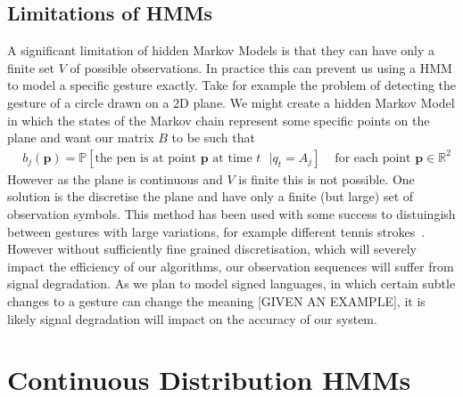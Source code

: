 \subsection{Limitations of HMMs}
A significant limitation of hidden Markov Models is that they can have only a finite set $V$ of possible observations. In practice this can prevent us using a HMM to model a specific gesture exactly. Take for example the problem of detecting the gesture of a circle drawn on a 2D plane. We might create a hidden Markov Model in which the states of the Markov chain represent some specific points on the plane and want our matrix $B$ to be such that
\begin{align*}
&b_j(\bm{p}) = \mathbb{P}[\text{the pen is at point $\bm{p}$ at time $t$ } | q_t = A_j] &\text{ for each point $\bm{p}\in\mathbb{R}^2$}
\end{align*}
However as the plane is continuous and $V$ is finite this is not possible. One solution is the discretise the plane and have only a finite (but large) set of observation symbols. This method has been used with some success to distuingish between gestures with large variations, for example different tennis strokes~\citep{yamato1992recognizing}. However without sufficiently fine grained discretisation, which will severely impact the efficiency of our algorithms, our observation sequences will suffer from signal degradation. As we plan to model signed languages, in which certain subtle changes to a gesture can change the meaning {\color{green}[GIVEN AN EXAMPLE]}, it is likely signal degradation will impact on the accuracy of our system.

\section{Continuous Distribution HMMs}




